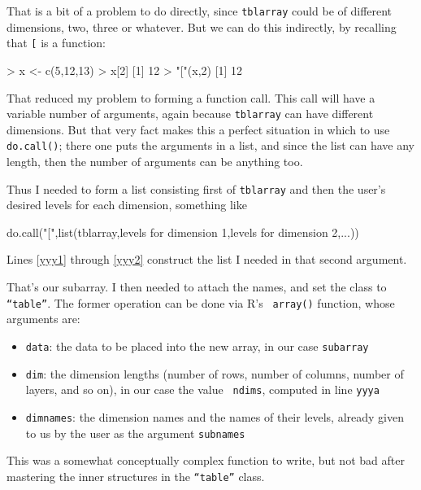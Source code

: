 That is a bit of a problem to do directly, since {\tt tblarray} could be
of different dimensions, two, three or whatever.  But we can do this
indirectly, by recalling that {\tt [} is a function:

\begin{Code}
> x <- c(5,12,13)
> x[2]
[1] 12
> "["(x,2)
[1] 12
\end{Code}

\noindent
That reduced my problem to forming a function call.  This call will have
a variable number of arguments, again because {\tt tblarray} can have
different dimensions.  But that very fact makes this
a perfect situation in which to use {\tt do.call()}; there one puts the
arguments in a list, and since the list can have any length, then the
number of arguments can be anything too.

Thus I needed to form a list consisting first of {\tt tblarray} and then
the user's desired levels for each dimension, something like

\begin{Code}
do.call("[",list(tblarray,levels for dimension 1,levels for dimension 2,...))
\end{Code}

\noindent
Lines \ref{yyy1} through \ref{yyy2} construct the list I needed in that
second argument.

That's our subarray.  I then needed to attach the names, and set the
class to {\tt ``table''}.  The former operation can be done via R's {\tt
array()} function, whose arguments are:

\begin{itemize}

\item {\tt data}:  the data to be placed into the new array, in our case
{\tt subarray}

\item {\tt dim}: the dimension lengths (number of rows, number of
columns, number of layers, and so on), in our case the value {\tt
ndims}, computed in line {\tt yyya} 

\item {\tt dimnames}:  the dimension names and the names of their
levels, already given to us by the user as the argument {\tt subnames} 

\end{itemize}

\noindent
This was a somewhat conceptually complex function to write, but not bad
after mastering the inner structures in the {\tt ``table''} class.

